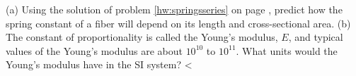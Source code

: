         (a) Using the solution of problem \ref{hw:springsseries}
        on page \pageref{hw:springsseries}, predict how the spring constant of
        a fiber will depend on its length and cross-sectional area.\hwendpart
        (b) The constant of proportionality is called the Young's
        modulus, $E$, and typical values of the Young's modulus are
        about $10^{10}$ to $10^{11}$. What units would the Young's modulus
        have in the SI system?
        <%
